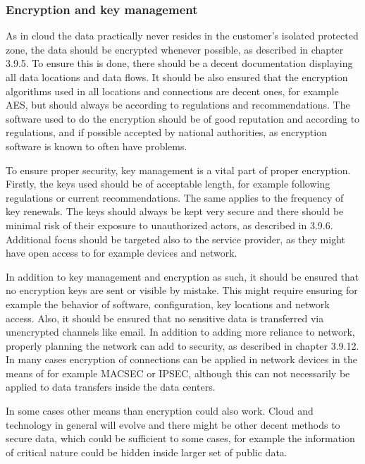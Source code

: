 \documentclass{article}
\begin{document}
\subsubsection{Encryption and key management} %
As in cloud the data practically never resides in the customer's isolated protected zone, the data should be encrypted whenever possible, as described in chapter 3.9.5. To ensure this is done, there should be a decent documentation displaying all data locations and data flows. It should be also ensured that the encryption algorithms used in all locations and connections are decent ones, for example AES, but should always be according to regulations and recommendations. The software used to do the encryption should be of good reputation and according to regulations, and if possible accepted by national authorities, as encryption software is known to often have problems.
\par
To ensure proper security, key management is a vital part of proper encryption. Firstly, the keys used should be of acceptable length, for example following regulations or current recommendations. The same applies to the frequency of key renewals. The keys should always be kept very secure and there should be minimal risk of their exposure to unauthorized actors, as described in 3.9.6. Additional focus should be targeted also to the service provider, as they might have open access to for example devices and network.
\par
In addition to key management and encryption as such, it should be ensured that no encryption keys are sent or visible by mistake. This might require ensuring for example the behavior of software, configuration, key locations and network access. Also, it should be ensured that no sensitive data is transferred via unencrypted channels like email. In addition to adding more reliance to network, properly planning the network can add to security, as described in chapter 3.9.12. In many cases encryption of connections can be applied in network devices in the means of for example MACSEC or IPSEC, although this can not necessarily be applied to data transfers inside the data centers.
\par
In some cases other means than encryption could also work. Cloud and technology in general will evolve and there might be other decent methods to secure data, which could be sufficient to some cases, for example the information of critical nature could be hidden inside larger set of public data.
\end{document}
